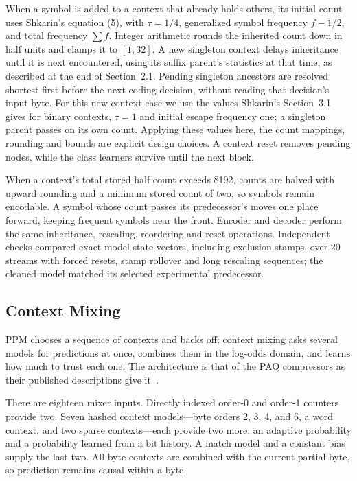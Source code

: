 \documentclass[10pt,letterpaper]{article}
\begin{document}
When a symbol is added to a context that already holds others, its initial count uses Shkarin's equation (5), with $\tau=1/4$, generalized symbol frequency $f-1/2$, and total frequency $\sum f$. Integer arithmetic rounds the inherited count down in half units and clamps it to $[1,32]$. A new singleton context delays inheritance until it is next encountered, using its suffix parent's statistics at that time, as described at the end of Section~2.1. Pending singleton ancestors are resolved shortest first before the next coding decision, without reading that decision's input byte. For this new-context case we use the values Shkarin's Section~3.1 gives for binary contexts, $\tau=1$ and initial escape frequency one; a singleton parent passes on its own count. Applying these values here, the count mappings, rounding and bounds are explicit design choices. A context reset removes pending nodes, while the class learners survive until the next block.

When a context's total stored half count exceeds 8192, counts are halved with upward rounding and a minimum stored count of two, so symbols remain encodable. A symbol whose count passes its predecessor's moves one place forward, keeping frequent symbols near the front. Encoder and decoder perform the same inheritance, rescaling, reordering and reset operations. Independent checks compared exact model-state vectors, including exclusion stamps, over 20 streams with forced resets, stamp rollover and long rescaling sequences; the cleaned model matched its selected experimental predecessor.

\subsection{Context Mixing}
PPM chooses a sequence of contexts and backs off; context mixing asks several models for predictions at once, combines them in the log-odds domain, and learns how much to trust each one. The architecture is that of the PAQ compressors as their published descriptions give it~\cite{mahoney,knoll}.

There are eighteen mixer inputs. Directly indexed order-0 and order-1 counters provide two. Seven hashed context models---byte orders 2, 3, 4, and 6, a word context, and two sparse contexts---each provide two more: an adaptive probability and a probability learned from a bit history. A match model and a constant bias supply the last two. All byte contexts are combined with the current partial byte, so prediction remains causal within a byte.
\end{document}
